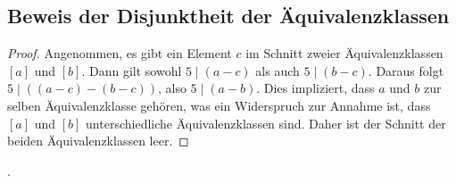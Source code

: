 \documentclass[12pt]{article}
\begin{document}
\subsection*{Beweis der Disjunktheit der Äquivalenzklassen}

\begin{proof}
	Angenommen, es gibt ein Element \( c \) im Schnitt zweier Äquivalenzklassen \( [a] \) und \( [b] \). Dann gilt sowohl \( 5 \mid (a - c) \) als auch \( 5 \mid (b - c) \). Daraus folgt \( 5 \mid ((a - c) - (b - c)) \), also \( 5 \mid (a - b) \). Dies impliziert, dass \( a \) und \( b \) zur selben Äquivalenzklasse gehören, was ein Widerspruch zur Annahme ist, dass \( [a] \) und \( [b] \) unterschiedliche Äquivalenzklassen sind. Daher ist der Schnitt der beiden Äquivalenzklassen leer.
\end{proof}

.
\end{document}
